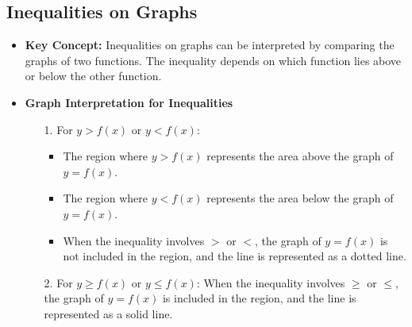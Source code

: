 
\subsection{Inequalities on Graphs}
\begin{itemize}
    \item \textbf{Key Concept:} Inequalities on graphs can be interpreted by comparing the graphs of two functions. The inequality
    depends on which function lies above or below the other function.
    \item \textbf{Graph Interpretation for Inequalities}
    \begin{itemize}
        \item[1.] For $y > f(x)$ or $y < f(x)$:
        \begin{itemize}
            \item The region where $y > f(x)$ represents the area above the graph of $y = f(x)$.
            \item The region where $y < f(x)$ represents the area below the graph of $y = f(x)$.
            \item When the inequality involves $>$ or $<$, the graph of $y = f(x)$ is not included in the region, and the line is
            represented as a dotted line.
        \end{itemize}
        \item[2.] For $y \geq f(x)$ or $y \leq f(x)$: When the inequality involves $\geq$ or $\leq$, the graph of $y = f(x)$ is
        included in the region, and the line is represented as a solid line.
    \end{itemize}
\end{itemize}